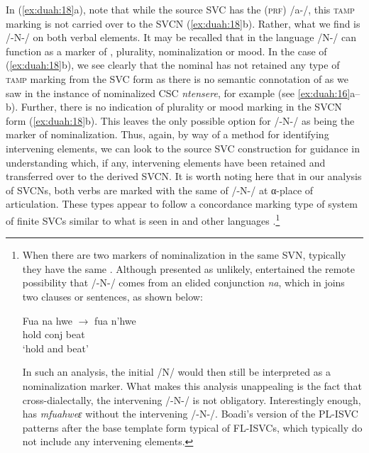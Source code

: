 \documentclass[output=paper,modfonts,nonflat,colorlinks, citecolor=brown, hidelinks]{langsci/langscibook}
\begin{document}
 
In (\ref{ex:duah:18}a), note that while the source SVC has the  (\textsc{prf}) /a-/, this \textsc{tamp} marking is not carried over to the SVCN (\ref{ex:duah:18}b). Rather, what we find is /-N-/ on both verbal elements. It may be recalled that in the  language /N-/ can function as a marker of , plurality, nominalization or mood. In the case of (\ref{ex:duah:18}b), we see clearly that the nominal has not retained any type of \textsc{tamp} marking from the SVC form as there is no semantic connotation of  as we saw in the instance of nominalized CSC \textit{ntensere}, for example (see \ref{ex:duah:16}a--b). Further, there is no indication of plurality or mood marking in the SVCN form (\ref{ex:duah:18}b). This leaves the only possible option for /-N-/ as being the marker of nominalization. Thus, again, by way of a method for identifying intervening elements, we can look to the source SVC construction for guidance in understanding which, if any, intervening elements have been retained and transferred over to the derived SVCN. It is worth noting here that in our analysis of SVCNs, both verbs are marked with the same  of /-N-/ at α-place of articulation. These types appear to follow a concordance marking type of system of finite SVCs similar to what is seen in  and other  languages \citep{aikhenvald2006}.\footnote{When there are two markers of nominalization in the same SVN, typically they have the same . Although presented as unlikely, \citet[211]{kambon2012} entertained the remote possibility that /-N-/ comes from an elided conjunction \textit{na}, which in  joins two clauses or sentences, as shown below:

\ea\label{ex:duah:19}  
\gll	Fua    	na       	hwe  $\rightarrow$    fua n’hwe\\
hold 	conj 	beat {} {} {} \\
\glt `hold and beat'
\z

In such an analysis, the initial /N/ would then still be interpreted as a nominalization marker. What makes this analysis unappealing is the fact that cross-dialectally, the intervening /-N-/ is not obligatory. Interestingly enough, \citet{boadi2005} has \textit{mfuahweɛ} without the intervening \linebreak /-N-/. Boadi’s version of the PL-ISVC patterns after the base template form typical of FL-ISVCs, which typically do not include any intervening elements.}
\end{document}
